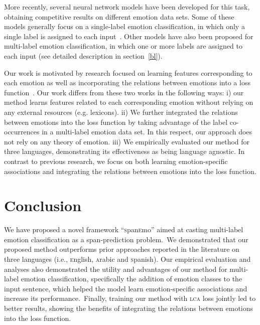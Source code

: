 \documentclass[11pt,a4paper]{article}
\begin{document}
More recently, several neural network models have been developed for this task, obtaining competitive results on different emotion data sets. Some of these models generally focus on a single-label emotion classification, in which only a single label is assigned to each input~\cite{islam-etal-2019-multi,xia-ding-2019-emotion,alhuzali-etal-2018-ubc,alhuzali2018enabling,agrawal2018learning,Saravia2018,felbo2017using,Abdul-Mageed2017}. Other models have also been proposed for multi-label emotion classification, in which one or more labels are assigned to each input (see detailed description in section~\ref{bl}).

Our work is motivated by research focused on learning features corresponding to each emotion as well as incorporating the relations between emotions into a loss function~\cite{fei2020latent,he2018joint}. Our work differs from these two works in the following ways: i) our method learns features related to each corresponding emotion without relying on any external resources (e.g. lexicons). ii) We further integrated the relations between emotions into the loss function by taking advantage of the label co-occurrences in a multi-label emotion data set. In this respect, our approach does not rely on any theory of emotion. iii) We empirically evaluated our method for three languages, demonstrating its effectiveness as being language agnostic. In contrast to previous research, we focus on both learning emotion-specific associations and integrating the relations between emotions into the loss function.  

\section{Conclusion} \label{conc}
We have proposed a novel framework ``\textsc{s}pan\textsc{e}mo'' aimed at casting multi-label emotion classification as a span-prediction problem.~We demonstrated that our proposed method outperforms prior approaches reported in the literature on three languages (i.e., \textsc{e}nglish, \textsc{a}rabic and \textsc{s}panish). Our empirical evaluation and analyses also demonstrated the utility and advantages of our method for multi-label emotion classification, specifically the addition of emotion classes to the input sentence, which helped the model learn emotion-specific associations and increase its performance.~Finally, training our method with \textsc{lca} loss jointly led to better results, showing the benefits of integrating the relations between emotions into the loss function. 
\end{document}
